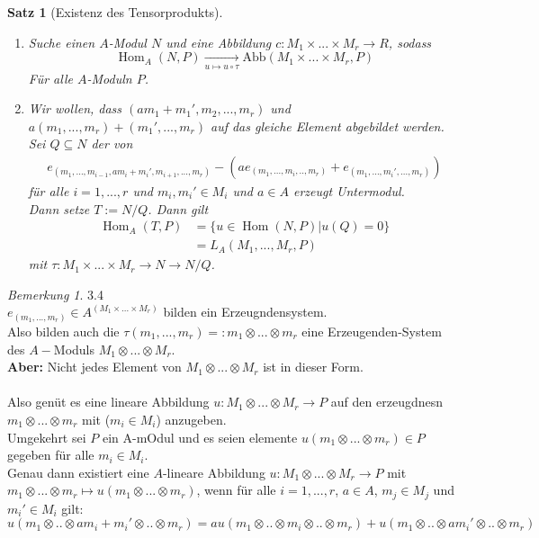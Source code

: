 \documentclass[10pt,a4paper]{article}
\newcommand{\Hom}{\operatorname{Hom}}
\newcounter{thm}[section]
\theoremstyle{definition}
\theoremstyle{plain}
\newtheorem{satz}[thm]{Satz}
\theoremstyle{remark}
\newtheorem{bem}[thm]{Bemerkung}
\begin{document}
\begin{satz}[Existenz des Tensorprodukts]
	\begin{enumerate}
		\item Suche einen $A$-Modul $N$ und eine Abbildung $c:M_1\times...\times M_r\rightarrow R$, sodass
		\[\Hom_A(N,P)\xrightarrow[u\mapsto u\circ\tau]{ }\text{Abb}(M_1\times...\times M_r,P)\]
		Für alle $A$-Moduln $P$.
		\item Wir wollen, dass $(am_1+m_1',m_2,...,m_r)$ und $a(m_1,...,m_r)+(m_1',...,m_r)$ auf das gleiche Element abgebildet werden.\\
		Sei $Q\subseteq N$ der von
		\begin{align*}
		e_{(m_1,...,m_{i-1},am_i+m_i',m_{i+1},...,m_r)}-\left(ae_{(m_1,...,m_i,..,m_r)}+e_{(m_1,...,m_i',...,m_r)}\right)
		\end{align*}
		für alle $i=1,...,r$ und $m_i,m_i'\in M_i$ und $a\in A$ erzeugt Untermodul.\\
		Dann setze $T:=N/Q$. Dann gilt
		\begin{align*}
		\Hom_A(T,P)&=\{u\in \Hom(N,P)|u(Q)=0\}\\
		&=L_A(M_1,...,M_r,P)
		\end{align*}
		mit $\tau:M_1\times...\times M_r\rightarrow N\rightarrow N/Q$.
	\end{enumerate}
\end{satz}
\begin{bem}
	3.4\\
	$e_{(m_1,...,m_r)}\in A^{(M_1\times...\times M_r)}$ bilden ein Erzeugndensystem.\\
	Also bilden auch die $\tau(m_1,...,m_r)=:m_1\otimes...\otimes m_r$ eine Erzeugenden-System des $A-$Moduls $M_1\otimes...\otimes M_r$.\\
	\textbf{Aber:} Nicht jedes Element von $M_1\otimes...\otimes M_r$ ist in dieser Form.\\
	\\
	Also genüt es eine lineare Abbildung $u:M_1\otimes...\otimes M_r\rightarrow P$ auf den erzeugdnesn $m_1\otimes...\otimes m_r$ mit ($m_i\in M_i$) anzugeben.\\
	Umgekehrt sei $P$ ein A-mOdul und es seien elemente $u(m_1\otimes...\otimes m_r)\in P$ gegeben für alle $m_i\in M_i$.\\
	Genau dann existiert eine $A$-lineare Abbildung $u:M_1\otimes...\otimes M_r\rightarrow P$ mit $m_1\otimes ...\otimes m_r\mapsto u(m_1\otimes ...\otimes m_r)$, wenn für alle $i=1,...,r$, $a\in A$, $m_j\in M_j$ und $m_i'\in M_i$ gilt:
	\[u(m_1\otimes ..\otimes a m_i+m_i'\otimes..\otimes m_r)=a u(m_1\otimes ..\otimes m_i\otimes..\otimes m_r)+u(m_1\otimes ..\otimes a m_i'\otimes..\otimes m_r)\]
\end{bem}
\end{document}
